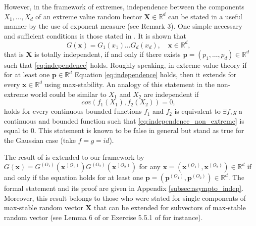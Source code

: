 \documentclass[11pt]{article}
\begin{document}
	However, in the framework of extremes, independence between the components $X_1, \dots, X_d$ of an extreme value random bector $\textbf{X} \in \mathbb{R}^d$ can be stated in a useful manner by the use of exponent measure (see Remark 3). One simple necessary and sufficient conditions is those stated in \cite{Takahashi1987SomePO, takahashi1994asymptotic}. It is shown that
	\begin{equation}
	\label{eq:independence}
		G(\textbf{x}) = G_1(x_1) \dots G_d(x_d), \quad \textbf{x} \in \mathbb{R}^d,
	\end{equation}
	 that is $\textbf{X}$ is totally independent, if and only if there exists $\textbf{p} = (p_1, \dots, p_d) \in \mathbb{R}^d$ such that \eqref{eq:independence} holds. Roughly speaking, in extreme-value theory if for at least one $\textbf{p} \in \mathbb{R}^d$ Equation \eqref{eq:independence} holds, then it extends for every $\textbf{x} \in \mathbb{R}^d$ using max-stability. An analogy of this statement in the non-extreme world could be similar to $X_1$ and $X_2$ are independent if
	 \begin{equation}
	 	\label{eq:independence_non_extreme}
	 	cov(f_1(X_1), f_2(X_2)) = 0,
	 \end{equation}
	 holds for every continuous bounded functions $f_1$ and $f_2$ is equivalent to $\exists f,g$ a continuous and bounded function such that \eqref{eq:independence_non_extreme} is equal to $0$. This statement is known to be false in general but stand as true for the Gaussian case (take $f = g = id$).
	 
	 The result of \cite{takahashi1994asymptotic} is extended to our framework by $G(\textbf{x}) = G^{(O_1)}(\textbf{x}^{(O_1)}) G^{(O_2)}(\textbf{x}^{(O_2)})$ for any $\textbf{x} = (\textbf{x}^{(O_1)}, \textbf{x}^{(O_2)}) \in \mathbb{R}^d$ if and only if the equation holds for at least one $\textbf{p} = (\textbf{p}^{(O_1)}, \textbf{p}^{(O_2)}) \in \mathbb{R}^d$. The formal statement and its proof are given in Appendix \ref{subsec:asympto_indep}. Moreover, this result belongs to those who were stated for single components of max-stable random vector $\textbf{X}$ that can be extended for subvectors of max-stable random vector (see Lemma 6 of \cite{papastathopoulos2016conditional} or Exercise 5.5.1 of \cite{resnick2008extreme} for instance).
	 
\end{document}
